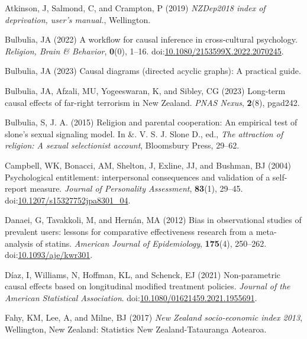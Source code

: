 \documentclass[
  singlecolumn]{article}
\newlength{\cslhangindent}
\newenvironment{CSLReferences}[2] %
 {\begin{list}{}{%
  \setlength{\itemindent}{0pt}
  \setlength{\leftmargin}{0pt}
  \setlength{\parsep}{0pt}
  \ifodd #1
   \setlength{\leftmargin}{\cslhangindent}
   \setlength{\itemindent}{-1\cslhangindent}
  \fi
  \setlength{\itemsep}{#2\baselineskip}}}
 {\end{list}}
\begin{document}
\label{refs}
\begin{CSLReferences}{1}{0}
Atkinson, J, Salmond, C, and Crampton, P (2019) \emph{NZDep2018 index of
deprivation, user{'}s manual.}, Wellington.

Bulbulia, JA (2022) A workflow for causal inference in cross-cultural
psychology. \emph{Religion, Brain \& Behavior}, \textbf{0}(0), 1--16.
doi:\href{https://doi.org/10.1080/2153599X.2022.2070245}{10.1080/2153599X.2022.2070245}.

Bulbulia, JA (2023) Causal diagrams (directed acyclic graphs): A
practical guide.

Bulbulia, JA, Afzali, MU, Yogeeswaran, K, and Sibley, CG (2023)
Long-term causal effects of far-right terrorism in {N}ew {Z}ealand.
\emph{PNAS Nexus}, \textbf{2}(8), pgad242.

Bulbulia, S, J. A. (2015) Religion and parental cooperation: An
empirical test of slone's sexual signaling model. In \&. V. S. J. Slone
D., ed., \emph{The attraction of religion: A sexual selectionist
account}, Bloomsbury Press, 29--62.

Campbell, WK, Bonacci, AM, Shelton, J, Exline, JJ, and Bushman, BJ
(2004) Psychological entitlement: interpersonal consequences and
validation of a self-report measure. \emph{Journal of Personality
Assessment}, \textbf{83}(1), 29--45.
doi:\href{https://doi.org/10.1207/s15327752jpa8301_04}{10.1207/s15327752jpa8301\_04}.

Danaei, G, Tavakkoli, M, and Hernán, MA (2012) Bias in observational
studies of prevalent users: lessons for comparative effectiveness
research from a meta-analysis of statins. \emph{American Journal of
Epidemiology}, \textbf{175}(4), 250--262.
doi:\href{https://doi.org/10.1093/aje/kwr301}{10.1093/aje/kwr301}.

Díaz, I, Williams, N, Hoffman, KL, and Schenck, EJ (2021) Non-parametric
causal effects based on longitudinal modified treatment policies.
\emph{Journal of the American Statistical Association}.
doi:\href{https://doi.org/10.1080/01621459.2021.1955691}{10.1080/01621459.2021.1955691}.

Fahy, KM, Lee, A, and Milne, BJ (2017) \emph{New Zealand socio-economic
index 2013}, Wellington, New Zealand: Statistics New Zealand-Tatauranga
Aotearoa.


\end{CSLReferences}
\end{document}
